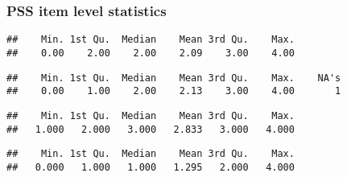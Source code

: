 \documentclass[]{article}
\newenvironment{Shaded}{\begin{snugshade}}{\end{snugshade}}
\newcommand{\KeywordTok}[1]{\textcolor[rgb]{0.13,0.29,0.53}{\textbf{#1}}}
\newcommand{\DecValTok}[1]{\textcolor[rgb]{0.00,0.00,0.81}{#1}}
\newcommand{\OperatorTok}[1]{\textcolor[rgb]{0.81,0.36,0.00}{\textbf{#1}}}
\newcommand{\NormalTok}[1]{#1}
\begin{document}
\subsubsection{PSS item level
statistics}\label{pss-item-level-statistics}

\begin{Shaded}
\end{Shaded}

\begin{verbatim}
##    Min. 1st Qu.  Median    Mean 3rd Qu.    Max. 
##    0.00    2.00    2.00    2.09    3.00    4.00
\end{verbatim}

\begin{Shaded}
\end{Shaded}

\begin{verbatim}
##    Min. 1st Qu.  Median    Mean 3rd Qu.    Max.    NA's 
##    0.00    1.00    2.00    2.13    3.00    4.00       1
\end{verbatim}

\begin{Shaded}
\end{Shaded}

\begin{verbatim}
##    Min. 1st Qu.  Median    Mean 3rd Qu.    Max. 
##   1.000   2.000   3.000   2.833   3.000   4.000
\end{verbatim}

\begin{Shaded}
\end{Shaded}

\begin{verbatim}
##    Min. 1st Qu.  Median    Mean 3rd Qu.    Max. 
##   0.000   1.000   1.000   1.295   2.000   4.000
\end{verbatim}
\end{document}
